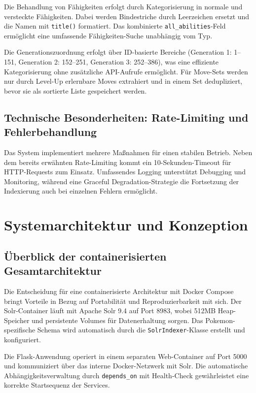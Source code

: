 Die Behandlung von Fähigkeiten erfolgt durch Kategorisierung in normale und versteckte Fähigkeiten. Dabei werden Bindestriche durch Leerzeichen ersetzt und die Namen mit \texttt{title()} formatiert. Das kombinierte \texttt{all\_abilities}-Feld ermöglicht eine umfassende Fähigkeiten-Suche unabhängig vom Typ.

Die Generationszuordnung erfolgt über ID-basierte Bereiche (Generation 1: 1--151, Generation 2: 152--251, Generation 3: 252--386), was eine effiziente Kategorisierung ohne zusätzliche API-Aufrufe ermöglicht. Für Move-Sets werden nur durch Level-Up erlernbare Moves extrahiert und in einem Set dedupliziert, bevor sie als sortierte Liste gespeichert werden.

\subsection{Technische Besonderheiten: Rate-Limiting und Fehlerbehandlung}

Das System implementiert mehrere Maßnahmen für einen stabilen Betrieb. Neben dem bereits erwähnten Rate-Limiting kommt ein 10-Sekunden-Timeout für HTTP-Requests zum Einsatz. Umfassendes Logging unterstützt Debugging und Monitoring, während eine Graceful Degradation-Strategie die Fortsetzung der Indexierung auch bei einzelnen Fehlern ermöglicht.

\section{Systemarchitektur und Konzeption}

\subsection{Überblick der containerisierten Gesamtarchitektur}

Die Entscheidung für eine containerisierte Architektur mit Docker Compose bringt Vorteile in Bezug auf Portabilität und Reproduzierbarkeit mit sich.
Der Solr-Container läuft mit Apache Solr 9.4 auf Port 8983, wobei 512MB Heap-Speicher und persistente Volumes für Datenerhaltung sorgen. Das Pokemon-spezifische Schema wird automatisch durch die \texttt{SolrIndexer}-Klasse erstellt und konfiguriert.

Die Flask-Anwendung operiert in einem separaten Web-Container auf Port 5000 und kommuniziert über das interne Docker-Netzwerk mit Solr. Die automatische Abhängigkeitsverwaltung durch \texttt{depends\_on} mit Health-Check gewährleistet eine korrekte Startsequenz der Services.

